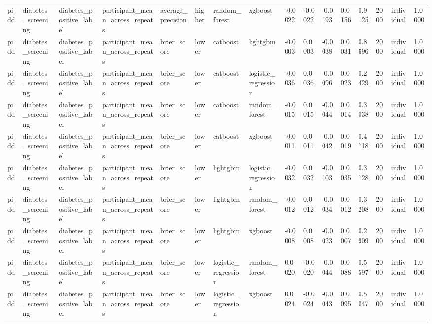 \begin{tabular}{llllllllllllllll}
pidd & diabetes\_screening & diabetes\_positive\_label & participant\_mean\_across\_repeats & average\_precision & higher & random\_forest & xgboost & -0.0022 & -0.0022 & -0.0193 & 0.0156 & 0.9125 & 2000 & individual & 1.0000 \\
pidd & diabetes\_screening & diabetes\_positive\_label & participant\_mean\_across\_repeats & brier\_score & lower & catboost & lightgbm & -0.0003 & 0.0003 & -0.0038 & 0.0031 & 0.8696 & 2000 & individual & 1.0000 \\
pidd & diabetes\_screening & diabetes\_positive\_label & participant\_mean\_across\_repeats & brier\_score & lower & catboost & logistic\_regression & -0.0036 & 0.0036 & -0.0096 & 0.0023 & 0.2429 & 2000 & individual & 1.0000 \\
pidd & diabetes\_screening & diabetes\_positive\_label & participant\_mean\_across\_repeats & brier\_score & lower & catboost & random\_forest & -0.0015 & 0.0015 & -0.0044 & 0.0014 & 0.3038 & 2000 & individual & 1.0000 \\
pidd & diabetes\_screening & diabetes\_positive\_label & participant\_mean\_across\_repeats & brier\_score & lower & catboost & xgboost & -0.0011 & 0.0011 & -0.0042 & 0.0019 & 0.4718 & 2000 & individual & 1.0000 \\
pidd & diabetes\_screening & diabetes\_positive\_label & participant\_mean\_across\_repeats & brier\_score & lower & lightgbm & logistic\_regression & -0.0032 & 0.0032 & -0.0103 & 0.0035 & 0.3728 & 2000 & individual & 1.0000 \\
pidd & diabetes\_screening & diabetes\_positive\_label & participant\_mean\_across\_repeats & brier\_score & lower & lightgbm & random\_forest & -0.0012 & 0.0012 & -0.0034 & 0.0012 & 0.3208 & 2000 & individual & 1.0000 \\
pidd & diabetes\_screening & diabetes\_positive\_label & participant\_mean\_across\_repeats & brier\_score & lower & lightgbm & xgboost & -0.0008 & 0.0008 & -0.0023 & 0.0007 & 0.2909 & 2000 & individual & 1.0000 \\
pidd & diabetes\_screening & diabetes\_positive\_label & participant\_mean\_across\_repeats & brier\_score & lower & logistic\_regression & random\_forest & 0.0020 & -0.0020 & -0.0044 & 0.0088 & 0.5597 & 2000 & individual & 1.0000 \\
pidd & diabetes\_screening & diabetes\_positive\_label & participant\_mean\_across\_repeats & brier\_score & lower & logistic\_regression & xgboost & 0.0024 & -0.0024 & -0.0043 & 0.0095 & 0.5047 & 2000 & individual & 1.0000 \\

\end{tabular}
